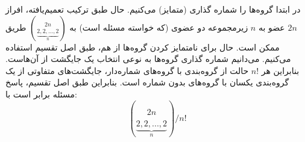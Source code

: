 \p
در ابتدا گروه‌ها را شماره گذاری
(متمایز)
می‌کنیم.
حال طبق ترکیب تعمیم‌یافته، افراز
$2n$
عضو به
$n$
زیرمجموعه دو عضوی (که خواسته مسئله است) به
${2n \choose \underbrace{2,2,...,2}_n}$
طریق ممکن است.
حال برای نامتمایز کردن گروه‌ها از هم، طبق اصل تقسیم استفاده می‌کنیم.
می‌دانیم شماره گذاری گروه‌ها به نوعی انتخاب یک جایگشت از آن‌هاست.
بنابراین هر
$n!$
حالت از گروه‌بندی با گروه‌های شماره‌دار، جایگشت‌های متفاوتی از
یک گروه‌بندی یکسان با گروه‌های بدون شماره است.
بنابراین طبق اصل تقسیم، پاسخ مسئله برابر است با:
$${2n \choose \underbrace{2,2,...,2}_n}/n!$$
